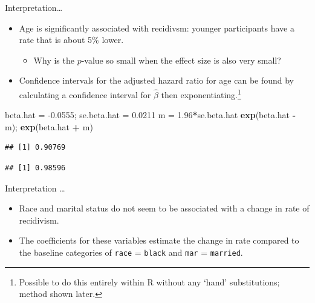 \documentclass[ignorenonframetext,]{beamer}
\newenvironment{Shaded}{\begin{snugshade}}{\end{snugshade}}
\newcommand{\FloatTok}[1]{\textcolor[rgb]{0.00,0.00,0.81}{#1}}
\newcommand{\KeywordTok}[1]{\textcolor[rgb]{0.13,0.29,0.53}{\textbf{#1}}}
\newcommand{\NormalTok}[1]{#1}
\newcommand{\OperatorTok}[1]{\textcolor[rgb]{0.81,0.36,0.00}{\textbf{#1}}}
\newcommand{\StringTok}[1]{\textcolor[rgb]{0.31,0.60,0.02}{#1}}
\providecommand{\tightlist}{%
  \setlength{\itemsep}{0pt}\setlength{\parskip}{0pt}}
\begin{document}
\begin{frame}[fragile]{%
\protect\hypertarget{interpretation-2}{%
Interpretation\ldots}}

\begin{itemize}
\item
  Age is significantly associated with recidivsm: younger participants
  have a rate that is about 5\% lower.

  \begin{itemize}
  \tightlist
  \item
    Why is the \(p\)-value so small when the effect size is also very
    small?
  \end{itemize}
\item
  Confidence intervals for the adjusted hazard ratio for age can be
  found by calculating a confidence interval for \(\widehat{\beta}\)
  then
  exponentiating.\footnote{Possible to do this entirely within \textsf{R} without any `hand' substitutions; method shown later.}
\end{itemize}

\small

\begin{Shaded}
\begin{Highlighting}[]
\NormalTok{beta.hat =}\StringTok{ }\FloatTok{-0.0555}\NormalTok{; se.beta.hat =}\StringTok{ }\FloatTok{0.0211}
\NormalTok{m =}\StringTok{ }\FloatTok{1.96}\OperatorTok{*}\NormalTok{se.beta.hat}
\KeywordTok{exp}\NormalTok{(beta.hat }\OperatorTok{-}\StringTok{ }\NormalTok{m); }\KeywordTok{exp}\NormalTok{(beta.hat }\OperatorTok{+}\StringTok{ }\NormalTok{m)}
\end{Highlighting}
\end{Shaded}

\begin{verbatim}
## [1] 0.90769
\end{verbatim}

\begin{verbatim}
## [1] 0.98596
\end{verbatim}

\end{frame}

\begin{frame}{%
\protect\hypertarget{interpretation-3}{%
Interpretation \ldots}}

\begin{itemize}
\item
  Race and marital status do not seem to be associated with a change in
  rate of recidivism.
\item
  The coefficients for these variables estimate the change in rate
  compared to the baseline categories of \texttt{race} = \texttt{black}
  and \texttt{mar} = \texttt{married}.
\end{itemize}

\end{frame}
\end{document}
